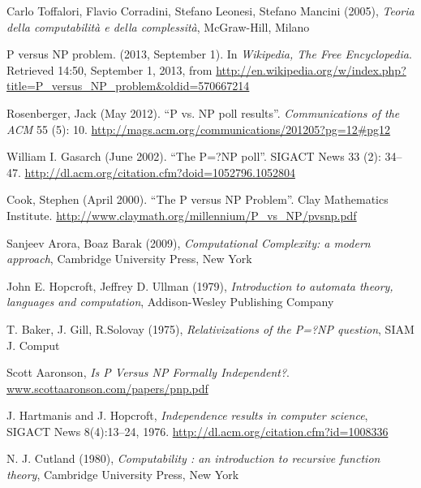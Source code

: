 \documentclass[12pt,a4paper]{report}
\theoremstyle{definition}
\begin{document}
\cleardoublepage
{}

\begin{thebibliography}{3}

Carlo Toffalori, Flavio Corradini, Stefano Leonesi, Stefano Mancini (2005),
\emph{Teoria della computabilità e della complessità}, McGraw-Hill, Milano

P versus NP problem. (2013, September 1). In \emph{Wikipedia, The Free Encyclopedia}. Retrieved 14:50, September 1, 2013, from \url{http://en.wikipedia.org/w/index.php?title=P_versus_NP_problem&oldid=570667214}

Rosenberger, Jack (May 2012). ``P vs. NP poll results''. \emph{Communications of the ACM} 55 (5): 10. \url{http://mags.acm.org/communications/201205?pg=12#pg12}

William I. Gasarch (June 2002). ``The P=?NP poll''. SIGACT News 33 (2): 34–47.
\url{http://dl.acm.org/citation.cfm?doid=1052796.1052804}

Cook, Stephen (April 2000). ``The P versus NP Problem''. Clay Mathematics Institute. 
\url{http://www.claymath.org/millennium/P_vs_NP/pvsnp.pdf}

Sanjeev Arora, Boaz Barak (2009), \emph{Computational Complexity: a modern approach}, Cambridge University Press, New York

John E. Hopcroft, Jeffrey D. Ullman (1979), \emph{Introduction to automata theory, languages and computation}, Addison-Wesley Publishing Company

T. Baker, J. Gill, R.Solovay (1975), \emph{Relativizations of the P=?NP question}, SIAM J. Comput

Scott Aaronson, \emph{Is P Versus NP Formally Independent?}. 
\url{www.scottaaronson.com/papers/pnp.pdf}

J. Hartmanis and J. Hopcroft, \emph{Independence results in computer science}, SIGACT News 8(4):13–24, 1976.
\url{http://dl.acm.org/citation.cfm?id=1008336}

N. J. Cutland (1980), \emph{Computability : an introduction to recursive function theory}, Cambridge University Press, New York

\end{thebibliography}
\end{document}
